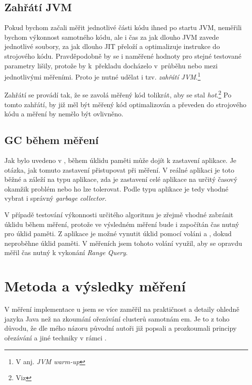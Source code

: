 \subsection{Zahřátí JVM}

Pokud bychom začali měřit jednotlivé části kódu ihned po startu JVM, neměřili bychom výkonnost samotného kódu, ale i čas za jak dlouho JVM zavede jednotlivé \classfile soubory, za jak dlouho JIT přeloží a optimalizuje instrukce \bytecode{} do strojového kódu. Pravděpodobně by se i naměřené hodnoty pro stejné testované parametry lišily, protože by k~překladu docházelo v~průběhu nebo mezi jednotlivými měřeními. Proto je nutné udělat i tzv. \emph{zahřátí JVM}.\footnote{V anj. \emph{JVM warm-up}}

Zahřátí se provádí tak, že se zavolá měřený kód tolikrát, aby se stal \emph{hot}.\footnote{Viz } Po tomto zahřátí, by již měl být měřený kód optimalizován a převeden do strojového kódu a měření by nemělo být ovlivněno.

\subsection{GC během měření}
Jak bylo uvedeno v , během úklidu paměti může dojít k zastavení aplikace.
Je otázka, jak tomuto zastavení přistupovat při měření.
V reálné aplikaci je toto běžné a záleží na typu aplikace, zda je zastavení celé aplikace na určitý časový okamžik problém nebo ho lze tolerovat.
Podle typu aplikace je tedy vhodné vybrat i správný \emph{garbage collector}.

V případě testování výkonnosti určitého algoritmu je zřejmě vhodné zabránit úklidu během měření, protože ve výsledném měření bude i započítán čas nutný pro úklid paměti.
Z aplikace je možné vynutit úklid pomocí voláni  a , dokud neproběhne úklid paměti.
V měřeních jsem tohoto volání využil, aby se opravdu měřil čas nutný k vykonání \emph{Range Query}.

\section{Metoda a výsledky měření}
V měření implementace \MIndex u jsem se více zaměřil na praktičnost a detaily ohledně jazyka Java než na zkoumání ořezávání clusterů samotnám \MIndex em.
Je to z toho důvodu, že dle mého názoru původní autoři již popsali a prozkoumali principy ořezávání a jiné techniky v rámci \MIndex.
 
